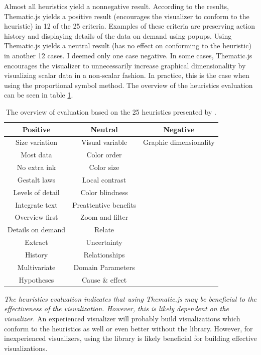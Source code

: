 Almost all heuristics yield a nonnegative result. According to the results, Thematic.js yields a positive result (encourages the visualizer to conform to the heuristic) in 12 of the 25 criteria. Examples of these criteria are preserving action history and displaying details of the data on demand using popups. Using Thematic.js yields a neutral result (has no effect on conforming to the heuristic) in another 12 cases. I deemed only one case negative. In some cases, Thematic.js encourages the visualizer to unnecessarily increase graphical dimensionality by visualizing scalar data in a non-scalar fashion. In practice, this is the case when using the proportional symbol method. The overview of the heuristics evaluation can be seen in table \ref{table:heuristicsevaluationoverview}.

\begin{table}[htb]
\centering
\begin{tabular}{|c|c|c|}
\hline
\textbf{Positive} & \textbf{Neutral} & \textbf{Negative} \\ 
\hline
Size variation & Visual variable & Graphic dimensionality \\
Most data & Color order & \\
No extra ink & Color size & \\
Gestalt laws & Local contrast & \\
Levels of detail & Color blindness & \\
Integrate text & Preattentive benefits & \\
Overview first & Zoom and filter & \\
Details on demand & Relate & \\
Extract & Uncertainty & \\
History & Relationships & \\
Multivariate & Domain Parameters & \\
Hypotheses & Cause \& effect & \\
\hline
\end{tabular}
\caption{The overview of evaluation based on the 25 heuristics presented by \citet{zuk_heuristics_2006}.}
\label{table:heuristicsevaluationoverview}
\end{table}

\emph{The heuristics evaluation indicates that using Thematic.js may be beneficial to the effectiveness of the visualization. However, this is likely dependent on the visualizer.} An experienced visualizer will probably build visualizations which conform to the heuristics as well or even better without the library. However, for inexperienced visualizers, using the library is likely beneficial for building effective visualizations. 

